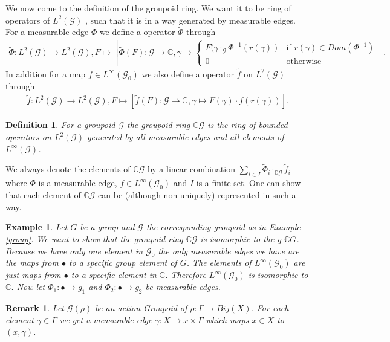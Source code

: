 \documentclass[12pt,a4paper]{scrartcl}
\newtheorem{Definition}[Theorem]{Definition}
\newtheorem{Example}[Theorem]{Example}
\newtheorem{Remark}[Theorem]{Remark}
\numberwithin{equation}{section}
\newcommand{\C}{\mathbb{C}} %
\newcommand{\2}{\mathbb{Z} / 2 \mathbb{Z}}
\newcommand{\G}{\mathcal{G}}
\newcommand{\1}{\overline{1}}
\newcommand{\0}{\overline{0}}
\begin{document}
We now come to the definition of the groupoid ring. We want it to be ring of operators of $L^2(\G)$ , such that it is in a way generated by measurable edges. For a measurable edge $\Phi$ we define a operator $\tilde \Phi$ through
\begin{align*}
	\tilde \Phi: L^2(\G) \to L^2(\G), F \mapsto \left[ \tilde \Phi (F): \G \to \C, \gamma \mapsto \begin{cases}
	F(\gamma \cdot_{\G} \Phi^{-1}(r(\gamma)) & \text{if } r(\gamma) \in Dom(\Phi^{-1}) \\
	0 & \text{otherwise}
	\end{cases} \right] .
\end{align*}
In addition for a map $f \in L^\infty (\G_0)$ we also define a operator $\tilde f$ on $L^2(\G)$ through
\begin{align*}
	\tilde f: L^2(\G) \to L^2(\G), F \mapsto [\tilde f(F): \G \to \C, \gamma \mapsto F(\gamma) \cdot f(r(\gamma))].
\end{align*}
\begin{Definition}
	For a groupoid $\G$ the groupoid ring $\C\G$ is the ring of bounded operators on $L^2(\G)$ generated by all measurable edges and all elements of $L^\infty(\G)$.
\end{Definition}
We always denote the elements of $\C\G$ by a linear combination $\sum_{i \in I} \tilde \Phi_i \cdot_{\C \G} \tilde f_i$ where $\Phi$ is a measurable edge, $f \in L^\infty(\G_0)$ and $I$ is a finite set. One can show that each element of $\C \G$ can be (although non-uniquely) represented in such a way. 
\begin{Example}
	Let $G$ be a group and $\G$ the corresponding groupoid as in Example \ref{group}. We want to show that the groupoid ring $\C \G$ is isomorphic to the g $\C G$. Because we have only one element in $\G_0$ the only measurable edges we have are the maps from $\bullet$ to a specific group element of $G$. The elements of $L^\infty(\G_0)$ are just maps from $\bullet$ to a specific element in $\C$. Therefore  $L^\infty(\G_0)$ is isomorphic to $\C$. Now let $\Phi_1: \bullet \mapsto g_1$ and $\Phi_2: \bullet \mapsto g_2$ be measurable edges. 
\end{Example}
\begin{Remark}
	Let $\G(\rho)$ be an action Groupoid of $\rho: \Gamma \to Bij(X)$. For each element $\gamma \in \Gamma$ we get a measurable edge $\bar{\gamma}: X \to x \times \Gamma$ which maps $x \in X$ to $(x, \gamma)$.
\end{Remark}
\end{document}
